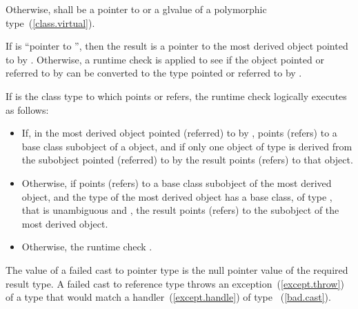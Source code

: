 \pnum
Otherwise,  shall be a pointer to or a glvalue of a polymorphic
type~(\ref{class.virtual}).

\pnum
If  is ``pointer to  '', then the result
is a pointer to the most derived object pointed to by .
Otherwise, a runtime check is applied to see if the object pointed or
referred to by  can be converted to the type pointed or
referred to by .

\pnum
If  is the class type to which  points or refers, the runtime
check logically executes as follows:

\begin{itemize}
\item If, in the most derived object pointed (referred) to by ,
 points (refers) to a  base class subobject of a
 object, and if only one object of type  is derived
from the subobject pointed (referred) to by  the result points (refers) to that  object.

\item Otherwise, if  points (refers) to a  base
class subobject of the most derived object, and the type of the most
derived object has a base class, of type , that is unambiguous
and , the result points (refers) to the
 subobject of the most derived object.

\item Otherwise, the
runtime check .
\end{itemize}

\pnum
The value of a failed cast to pointer type is the null pointer value of
the required result type. A failed cast to reference type throws
an exception~(\ref{except.throw}) of a type that would match a
handler~(\ref{except.handle}) of type ~(\ref{bad.cast}).

